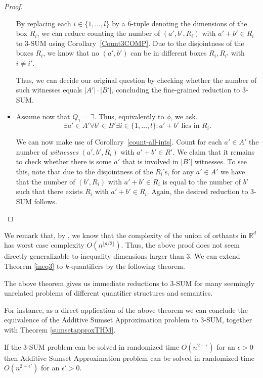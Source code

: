 \begin{proof}
\begin{itemize}
		  By replacing each $i \in \{1,\dots,l\}$ by a 6-tuple denoting the dimensions of the box $R_i$, we can reduce counting the number of $(a',b',R_i)$ with $a'+b' \in R_i$ to 3-SUM using Corollary~\ref{Count3COMP}.
		  Due to the disjointness of the boxes $R_i$, we know that no $(a',b')$ can be in different boxes $R_i, R_{i'}$ with $i\ne i'$.

  Thus, we can decide our original question by checking whether the number of such witnesses equals $|A'| \cdot |B'|$, concluding the fine-grained reduction to 3-SUM.


  \item Assume now that $Q_1=\exists$. Thus, equivalently to $\phi$, we ask.
  $$\exists a' \in A' \forall b' \in B' \exists i \in \{1,\dots,l\}: a'+b' \text{ lies in } R_i.$$

		  We can now make use of Corollary~\ref{count-all-ints}. Count for each $a' \in A'$ the number of \emph{witnesses} $(a',b',R_i)$ with $a'+b'\in R'$. We claim that it remains to check
whether there is some $a'$ that is involved in $|B'|$ witnesses. 
		  To see this, note that due to the disjointness of the $R_{i}$'s, for any $a'\in A'$ we have that the number of $(b',R_i)$ with $a'+b'\in R_i$ is equal to the number of $b'$ such that there exists $R_i$ with $a'+b'\in R_i$. Again, the desired reduction to 3-SUM follows. \qedhere
  \end{itemize}  
\end{proof}

We remark that, by \cite{DBLP:journals/dcg/BoissonnatSTY98}, we know that the complexity of the union of orthants in $\mathbb{R}^d$ has worst case complexity $O(n^{\lfloor d/2 \rfloor})$.
Thus, the above proof does not seem directly generalizable to inequality dimensions larger than 3.
We can extend Theorem \ref{ineq3} to $k$-quantifiers by the following theorem.


\threesumineq*

  The above theorem gives us immediate reductions to $3$-SUM for many seemingly unrelated problems of different 
  quantifier structures and semantics.

  For instance, as a direct application of the above theorem we can conclude the equivalence of the 
  Additive Sumset Approximation problem to $3$-SUM, together with Theorem \ref{sumsetapproxTHM}.

  \begin{lemma}
    If the $3$-SUM problem can be solved in randomized time $O(n^{2-\epsilon})$ for an $\epsilon>0$
    then Additive Sumset Approximation problem can be solved in randomized time 
    $O(n^{2-\epsilon'})$ for an $\epsilon'>0$.
    \end{lemma}
